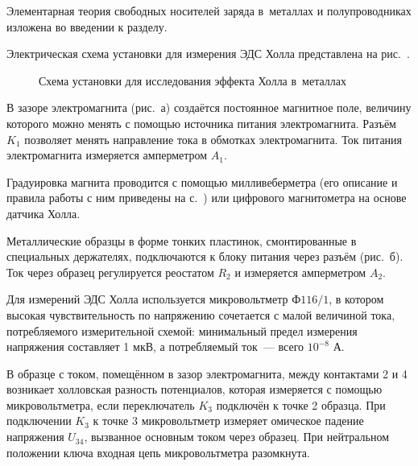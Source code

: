 \newpage
{}



Элементарная теория свободных носителей заряда в~металлах и полупроводниках изложена во введении к разделу.

\experiment Электрическая схема установки для измерения ЭДС Холла представлена на рис.~.

\begin{figure}[h!]
	\caption{Схема установки для исследования эффекта Холла в~металлах}
\end{figure}

В зазоре электромагнита (рис.~а) создаётся постоянное магнитное поле, величину которого можно менять с помощью источника питания электромагнита. Разъём $K_1$ позволяет менять направление тока в обмотках электромагнита. Ток питания электромагнита измеряется амперметром $A_1$.

Градуировка магнита проводится с помощью милливеберметра (его описание и правила работы с ним приведены на с.~\pageref{MWB}) или цифрового магнитометра на основе датчика Холла.

Металлические образцы в форме тонких пластинок, смонтированные в специальных держателях, подключаются к блоку питания через разъём (рис.~б). Ток через образец регулируется реостатом $R_2$ и измеряется амперметром $A_2$.

Для измерений ЭДС Холла используется микровольтметр $\text{Ф}116/1$, в котором высокая чувствительность по напряжению сочетается с малой величиной тока, потребляемого измерительной схемой: минимальный предел измерения напряжения составляет 1 мкВ, а потребляемый ток~--- всего $10^{-8}$ А.

В образце с током, помещённом в зазор электромагнита, между контактами 2 и 4 возникает холловская разность потенциалов, которая измеряется с помощью микровольтметра, если переключатель $K_3$ подключён к точке 2 образца. При подключении $K_3$ к точке 3 микровольтметр измеряет омическое падение напряжения $U_{34}$, вызванное основным током через образец. При нейтральном положении ключа входная цепь микровольтметра разомкнута.

